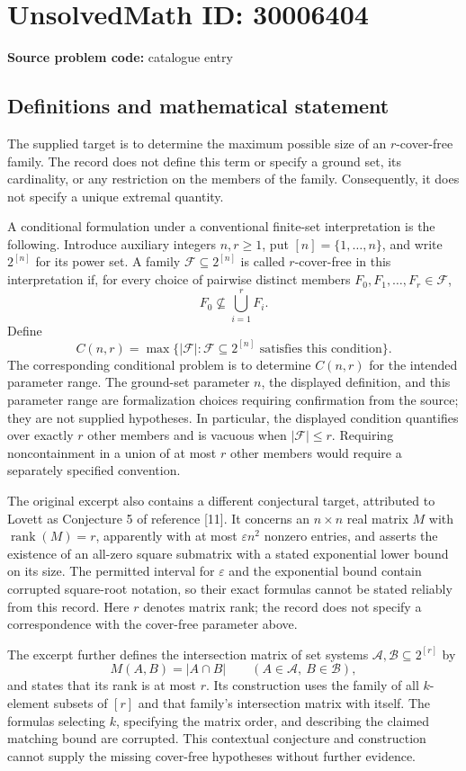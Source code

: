 \documentclass[11pt]{article}
\begin{document}
\section*{UnsolvedMath ID: 30006404}
\textbf{Source problem code:} catalogue entry
\subsection{Definitions and mathematical statement}
The supplied target is to determine the maximum possible size of an \(r\)-cover-free family. The record does not define this term or specify a ground set, its cardinality, or any restriction on the members of the family. Consequently, it does not specify a unique extremal quantity.

A conditional formulation under a conventional finite-set interpretation is the following. Introduce auxiliary integers \(n,r\geq 1\), put \([n]=\{1,\ldots,n\}\), and write \(2^{[n]}\) for its power set. A family \(\mathcal F\subseteq 2^{[n]}\) is called \(r\)-cover-free in this interpretation if, for every choice of pairwise distinct members \(F_0,F_1,\ldots,F_r\in\mathcal F\),
\[
 F_0\not\subseteq\bigcup_{i=1}^{r}F_i.
\]
Define
\[
 C(n,r)=\max\bigl\{|\mathcal F|:\mathcal F\subseteq 2^{[n]}\text{ satisfies this condition}\bigr\}.
\]
The corresponding conditional problem is to determine \(C(n,r)\) for the intended parameter range. The ground-set parameter \(n\), the displayed definition, and this parameter range are formalization choices requiring confirmation from the source; they are not supplied hypotheses. In particular, the displayed condition quantifies over exactly \(r\) other members and is vacuous when \(|\mathcal F|\leq r\). Requiring noncontainment in a union of at most \(r\) other members would require a separately specified convention.

The original excerpt also contains a different conjectural target, attributed to Lovett as Conjecture 5 of reference [11]. It concerns an \(n\times n\) real matrix \(M\) with \(\operatorname{rank}(M)=r\), apparently with at most \(\varepsilon n^2\) nonzero entries, and asserts the existence of an all-zero square submatrix with a stated exponential lower bound on its size. The permitted interval for \(\varepsilon\) and the exponential bound contain corrupted square-root notation, so their exact formulas cannot be stated reliably from this record. Here \(r\) denotes matrix rank; the record does not specify a correspondence with the cover-free parameter above.

The excerpt further defines the intersection matrix of set systems \(\mathcal A,\mathcal B\subseteq 2^{[r]}\) by
\[
 M(A,B)=|A\cap B|\qquad(A\in\mathcal A,\ B\in\mathcal B),
\]
and states that its rank is at most \(r\). Its construction uses the family of all \(k\)-element subsets of \([r]\) and that family's intersection matrix with itself. The formulas selecting \(k\), specifying the matrix order, and describing the claimed matching bound are corrupted. This contextual conjecture and construction cannot supply the missing cover-free hypotheses without further evidence.
\end{document}

